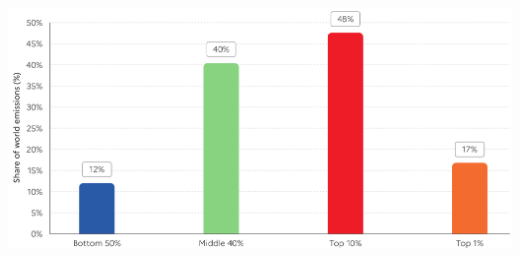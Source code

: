 \begin{frame}
\begin{scriptsize}
\begin{columns}
      \begin{center}
          \includegraphics[width=1.0\textwidth]{plots/WIR_budget.png}
      \end{center}
    \end{columns}

  \end{scriptsize}
  \end{frame}  

